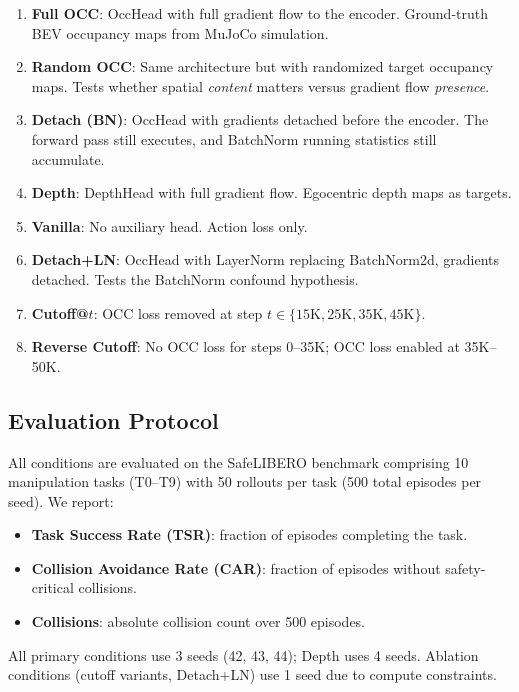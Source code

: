 \documentclass[10pt,letterpaper]{article}
\begin{document}
\begin{enumerate}
    \item \textbf{Full OCC}: OccHead with full gradient flow to the encoder. Ground-truth BEV occupancy maps from MuJoCo simulation.
    \item \textbf{Random OCC}: Same architecture but with randomized target occupancy maps. Tests whether spatial \emph{content} matters versus gradient flow \emph{presence}.
    \item \textbf{Detach (BN)}: OccHead with gradients detached before the encoder. The forward pass still executes, and BatchNorm running statistics still accumulate.
    \item \textbf{Depth}: DepthHead with full gradient flow. Egocentric depth maps as targets.
    \item \textbf{Vanilla}: No auxiliary head. Action loss only.
    \item \textbf{Detach+LN}: OccHead with LayerNorm replacing BatchNorm2d, gradients detached. Tests the BatchNorm confound hypothesis.
    \item \textbf{Cutoff@$t$}: OCC loss removed at step $t \in \{15\text{K}, 25\text{K}, 35\text{K}, 45\text{K}\}$.
    \item \textbf{Reverse Cutoff}: No OCC loss for steps 0--35K; OCC loss enabled at 35K--50K.
\end{enumerate}

\subsection{Evaluation Protocol}

All conditions are evaluated on the SafeLIBERO benchmark comprising 10 manipulation tasks (T0--T9) with 50 rollouts per task (500 total episodes per seed). We report:
\begin{itemize}
    \item \textbf{Task Success Rate (TSR)}: fraction of episodes completing the task.
    \item \textbf{Collision Avoidance Rate (CAR)}: fraction of episodes without safety-critical collisions.
    \item \textbf{Collisions}: absolute collision count over 500 episodes.
\end{itemize}

All primary conditions use 3 seeds (42, 43, 44); Depth uses 4 seeds. Ablation conditions (cutoff variants, Detach+LN) use 1 seed due to compute constraints.

\end{document}
